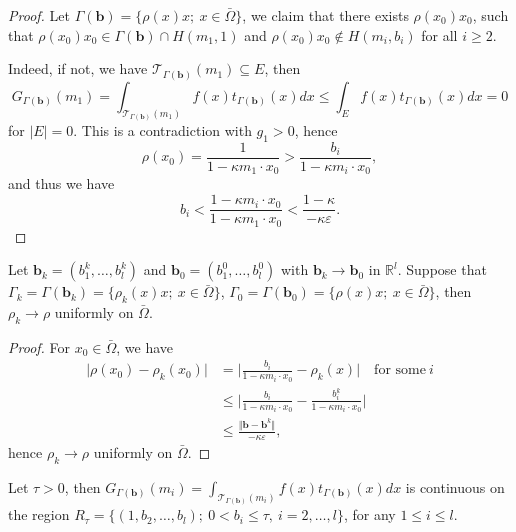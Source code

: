 \documentclass[a4paper,12pt,]{article}
\newtheorem{lemma}{\hskip\parindent\bf Lemma}[section]%
\numberwithin{equation}{section}
\numberwithin{equation}{section} \allowdisplaybreaks
\begin{document}
\begin{proof}
  Let $\Gamma(\mathbf{b}) = \{\rho(x)x;~x \in \bar{\Omega}\}$, we claim that there exists $\rho(x_{0})x_{0}$, such that $\rho(x_{0})x_{0} \in \Gamma(\mathbf{b}) \cap H(m_{1},1)$ and $\rho(x_{0})x_{0} \notin H(m_{i},b_{i})$ for all $i \geq 2$.

  Indeed, if not, we have $\mathcal{T}_{\Gamma(\mathbf{b})}(m_{1}) \subseteq E$, then
  $$G_{\Gamma(\mathbf{b})}(m_{1}) = \int_{\mathcal{T}_{\Gamma(\mathbf{b})}(m_{1})} f(x)t_{\Gamma(\mathbf{b})}(x)dx \leq \int_{E} f(x)t_{\Gamma(\mathbf{b})}(x)dx = 0$$
  for $\vert E \vert =0$. This is a contradiction with $g_{1} >0$, hence
  $$\rho(x_{0}) = \frac{1}{1 - \kappa m_{1} \cdot x_{0}} > \frac{b_{i}}{1 - \kappa m_{i} \cdot x_{0}},$$
  and thus we have
  $$b_{i} < \frac{1 - \kappa m_{i} \cdot x_{0}}{1 - \kappa m_{1} \cdot x_{0}} < \frac{1 - \kappa}{-\kappa \varepsilon}.$$
\end{proof}

\begin{lemma}
  Let $\mathbf{b}_{k} = (b_{1}^{k},\ldots,b_{l}^{k})$ and $\mathbf{b}_{0} = (b_{1}^{0},\ldots,b_{l}^{0})$ with $\mathbf{b}_{k}\rightarrow \mathbf{b}_{0}$ in $\mathbb{R}^{l}$. Suppose that $\Gamma_{k} = \Gamma(\mathbf{b}_{k}) = \{\rho_{k}(x)x;~x\in \bar{\Omega}\}$, $\Gamma_{0} = \Gamma(\mathbf{b}_{0}) = \{\rho(x)x;~x\in \bar{\Omega}\}$, then $\rho_{k} \rightarrow \rho$ uniformly on $\bar{\Omega}$.
  \label{lem3.9}
\end{lemma}

\begin{proof}
  For $x_{0} \in \bar{\Omega}$, we have
  \begin{align*}
    \vert \rho(x_{0}) - \rho_{k}(x_{0}) \vert & = \vert \frac{b_{i}}{1 - \kappa m_{i} \cdot x_{0}} - \rho_{k}(x) \vert \quad \text{for some}~i  \\
     & \leq  \vert \frac{b_{i}}{1 - \kappa m_{i} \cdot x_{0}} - \frac{b_{i}^{k}}{1 - \kappa m_{i} \cdot x_{0}} \vert \\
     & \leq \frac{\Vert \mathbf{b} - \mathbf{b}^{k} \Vert}{-\kappa \varepsilon},
  \end{align*}
  hence $\rho_{k}\rightarrow \rho$ uniformly on $\bar{\Omega}$.
\end{proof}

\begin{lemma}
  Let $\tau >0$, then $G_{\Gamma(\mathbf{b})}(m_{i}) = \displaystyle\int_{\mathcal{T}_{\Gamma(\mathbf{b})}(m_{i})}f(x)t_{\Gamma(\mathbf{b})}(x)dx$ is continuous on the region $R_{\tau} = \{(1,b_{2},\ldots, b_{l});~0<b_{i}\leq \tau,~i=2,\ldots,l\}$, for any $1 \leq i \leq l$.
  \label{lem3.10}
\end{lemma}
\end{document}
